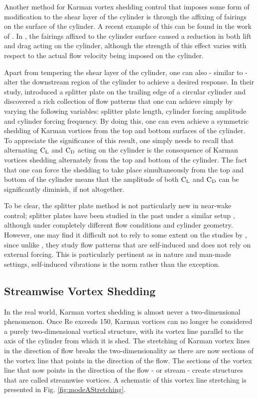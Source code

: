 \documentclass[oneside]{utmthesis}
\begin{document}
Another method for Karman vortex shedding control that imposes some form of modification to the shear layer of the cylinder is through the affixing of fairings on the surface of the cylinder. A recent example of this can be found in the work of \citet{Kang2020}. In \citet{Kang2020}, the fairings affixed to the cylinder surface caused a reduction in both lift and drag acting on the cylinder, although the strength of this effect varies with respect to the actual flow velocity being imposed on the cylinder.

Apart from tempering the shear layer of the cylinder, one can also - similar to \citet{Yokoi2016} - alter the downstream region of the cylinder to achieve a desired response. In their study, \citet{Yokoi2016} introduced a splitter plate on the trailing edge of a circular cylinder and discovered a rich collection of flow patterns that one can achieve simply by varying the following variables: splitter plate length, cylinder forcing amplitude and cylinder forcing frequency. By doing this, one can even achieve a symmetric shedding of Karman vortices from the top and bottom surfaces of the cylinder. To appreciate the significance of this result, one simply needs to recall that alternating $\text{C}_{\text{L}}$ and $\text{C}_{\text{D}}$ acting on the cylinder is the consequence of Karman vortices shedding alternately from the top and bottom of the cylinder. The fact that one can force the shedding to take place simultaneously from the top and bottom of the cylinder means that the amplitude of both $\text{C}_{\text{L}}$ and $\text{C}_{\text{D}}$ can be significantly diminish, if not altogether.

To be clear, the splitter plate method is not particularly new in near-wake control; splitter plates have been studied in the past under a similar setup \citep{MatAli2012}, although under completely different flow conditions and cylinder geometry. However, one may find it difficult not to rely to some extent on the studies by \citet{MatAli2012}, since unlike \citet{Yokoi2016}, they study flow patterns that are self-induced and does not rely on external forcing. This is particularly pertinent as in nature and man-made settings, self-induced vibrations is the norm rather than the exception.

\subsection{Streamwise Vortex Shedding} \label{ssec:svShedding}

In the real world, Karman vortex shedding is almost never a two-dimensional phenomenon. Once Re exceeds 150, Karman vortices can no longer be considered a purely two-dimensional vortical structure, with its vortex line parallel to the axis of the cylinder from which it is shed. The stretching of Karman vortex lines in the direction of flow breaks the two-dimensionality as there are now sections of the vortex line that points in the direction of the flow. The sections of the vortex line that now points in the direction of the flow - or stream - create structures that are called streamwise vortices. A schematic of this vortex line stretching is presented in Fig. \ref{fig:modeAStretching}.
\end{document}
